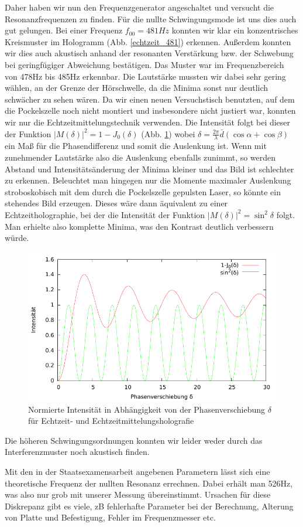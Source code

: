 Daher haben wir nun den Frequenzgenerator angeschaltet und versucht die Resonanzfrequenzen zu finden. Für die nullte Schwingungsmode ist uns dies auch gut gelungen. Bei einer Frequenz $f_{00} = 481 Hz$ konnten wir klar ein konzentrisches Kreismuster im Hologramm (Abb. \ref{echtzeit_481}) erkennen. Außerdem konnten wir dies auch akustisch anhand der resonanten Verstärkung bzw. der Schwebung bei geringfügiger Abweichung bestätigen. Das Muster war im Frequenzbereich von 478Hz bis 485Hz erkennbar. Die Lautstärke mussten wir dabei sehr gering wählen, an der Grenze der Hörschwelle, da die Minima sonst nur deutlich schwächer zu sehen wären. Da wir einen neuen Versuchstisch benutzten, auf dem die Pockelszelle noch nicht montiert und insbesondere nicht justiert war, konnten wir nur die Echtzeitmittelungstechnik verwenden. Die Intensität folgt bei dieser der Funktion $|M(\delta)|^2 = 1 - J_0(\delta)$ (Abb. \ref{echtzeit_intensität}) wobei $\delta = \frac{2\pi}{\lambda}\bar{d}(\cos \alpha + \cos \beta)$ ein Maß für die Phasendifferenz und somit die Auslenkung ist. Wenn mit zunehmender Lautstärke also die Auslenkung ebenfalls zunimmt, so werden Abstand und Intensitätsänderung der Minima kleiner und das Bild ist schlechter zu erkennen. Beleuchtet man hingegen nur die Momente maximaler Auslenkung stroboskobisch mit dem durch die Pockelszelle gepulsten Laser, so könnte ein stehendes Bild erzeugen. Dieses wäre dann äquivalent zu einer Echtzeitholographie, bei der die Intensität der Funktion $|M(\delta)|^2 = \sin^2 \delta$ folgt. Man erhielte also komplette Minima, was den Kontrast deutlich verbessern würde.

\begin{figure}[H]
\includegraphics[width=\textwidth]{Graphen/echtzeitmittelung.pdf}
\caption{Normierte Intensität in Abhängigkeit von der Phasenverschiebung $\delta$ für Echtzeit- und Echtzeitmittelungsholografie}
\label{echtzeit_intensität}
\end{figure}

Die höheren Schwingungsordnungen konnten wir leider weder durch das Interferenzmuster noch akustisch finden.

Mit den in der Staatsexamensarbeit angebenen Parametern lässt sich eine theoretische Frequenz der nullten Resonanz errechnen. Dabei erhält man 526Hz, was also nur grob mit unserer Messung übereinstimmt. Ursachen für diese Diskrepanz gibt es viele, zB fehlerhafte Parameter bei der Berechnung, Alterung von Platte und Befestigung, Fehler im Frequenzmesser etc.